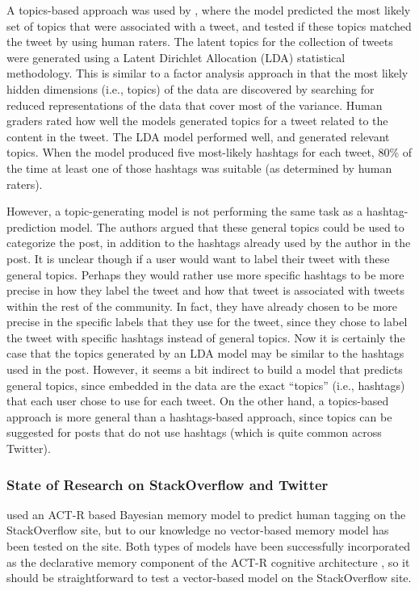 \documentclass[man,floatsintext,donotrepeattitle]{apa6}
\begin{document}
A topics-based approach was used by \textcite{Godin2013}, where the model predicted the most likely set of topics that were associated with a tweet, and tested if these topics matched the tweet by using human raters.
The latent topics for the collection of tweets were generated using a Latent Dirichlet Allocation (LDA) statistical methodology.
This is similar to a factor analysis approach in that the most likely hidden dimensions (i.e., topics) of the data are discovered by searching for reduced representations of the data that cover most of the variance. 
Human graders rated how well the models generated topics for a tweet related to the content in the tweet.
The LDA model performed well, and generated relevant topics.
When the model produced five most-likely hashtags for each tweet, 80\% of the time at least one of those hashtags was suitable (as determined by human raters).

However, a topic-generating model is not performing the same task as a hashtag-prediction model.
The authors argued that these general topics could be used to categorize the post, in addition to the hashtags already used by the author in the post.
It is unclear though if a user would want to label their tweet with these general topics.
Perhaps they would rather use more specific hashtags to be more precise in how they label the tweet and how that tweet is associated with tweets within the rest of the community.
In fact, they have already chosen to be more precise in the specific labels that they use for the tweet, since they chose to label the tweet with specific hashtags instead of general topics.
Now it is certainly the case that the topics generated by an LDA model may be similar to the hashtags used in the post.
However, it seems a bit indirect to build a model that predicts general topics, since embedded in the data are the exact ``topics'' (i.e., hashtags) that each user chose to use for each tweet.
On the other hand, a topics-based approach is more general than a hashtags-based approach, since topics can be suggested for posts that do not use hashtags (which is quite common across Twitter).

\subsubsection{State of Research on StackOverflow and Twitter}

\textcite{Stanley2013} used an ACT-R based Bayesian memory model to predict human tagging on the StackOverflow site, but to our knowledge no vector-based memory model has been tested on the site.
Both types of models have been successfully incorporated as the declarative memory component of the ACT-R cognitive architecture \parencite{Rutledge2007},
so it should be straightforward to test a vector-based model on the StackOverflow site.
\end{document}
